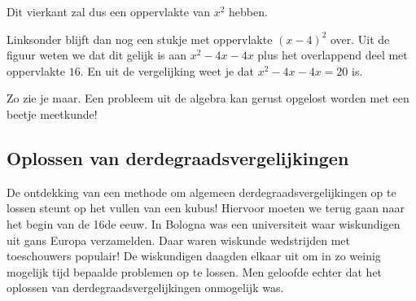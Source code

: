 
\answer[4cm]{
\begin{center}

\end{center}
}

Dit vierkant zal dus een oppervlakte van $x^2$ hebben.


\answer[4cm]{
\begin{center}

\end{center}
}



Linksonder blijft dan nog een stukje met oppervlakte $(x-4)^2$ over. Uit de figuur weten we dat dit gelijk is aan $x^2 -4x -4x$ plus het overlappend deel met oppervlakte $16$. En uit de vergelijking weet je dat $x^2 -4x -4x=20$ is.



Zo zie je maar. Een probleem uit de algebra kan gerust opgelost worden met een beetje meetkunde!

\subsection{Oplossen van derdegraadsvergelijkingen}

De ontdekking van een methode om algemeen derdegraadsvergelijkingen op te lossen steunt op het vullen van een kubus! Hiervoor moeten we terug gaan naar het begin van de 16de eeuw. In Bologna was een universiteit waar wiskundigen uit gans Europa verzamelden. Daar waren wiskunde wedstrijden met toeschouwers populair! De wiskundigen daagden elkaar uit om in zo weinig mogelijk tijd bepaalde problemen op te lossen. Men geloofde echter dat het oplossen van derdegraadsvergelijkingen onmogelijk was.

